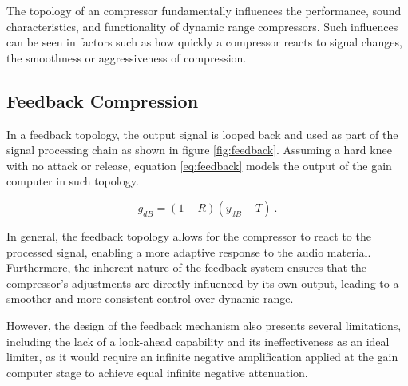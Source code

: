 \documentclass[10pt]{article}
\begin{document}
\begin{multicols*}{2}
            \noindent The topology of an compressor fundamentally influences the performance, sound characteristics, and functionality of dynamic range compressors. Such influences can be seen in factors such as how quickly a compressor reacts to signal changes, the smoothness or aggressiveness of compression.

            \subsection{Feedback Compression}
                In a feedback topology, the output signal is looped back and used as part of the signal processing chain as shown in figure \ref{fig:feedback}. Assuming a hard knee with no attack or release, equation \ref{eq:feedback} models the output of the gain computer in such topology.\par

                    \begin{equation} \label{eq:feedback}
                        g_{dB}=(1-R)(y_{dB}-T)\ .
                    \end{equation}
                
                \noindent In general, the feedback topology allows for the compressor to react to the processed signal, enabling a more adaptive response to the audio material. Furthermore, the inherent nature of the feedback system ensures that the compressor's adjustments are directly influenced by its own output, leading to a smoother and more consistent control over dynamic range.\par
                However, the design of the feedback mechanism also presents several limitations, including the lack of a look-ahead capability and its ineffectiveness as an ideal limiter, as it would require an infinite negative amplification applied at the gain computer stage to achieve equal infinite negative attenuation.

                \vspace{2ex}

                    \noindent
                    \begin{minipage}{\linewidth}

                        \centering

\end{minipage}
\end{multicols*}
\end{document}
